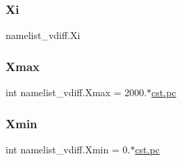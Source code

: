 \subsubsection{\texorpdfstring{Xi}{Xi}}
{\footnotesize\ttfamily namelist\+\_\+vdiff.\+Xi}

\mbox{\label{namespacenamelist__vdiff_a7cd8a3edb14ea27a804141f3e858ed3e}} 
\subsubsection{\texorpdfstring{Xmax}{Xmax}}
{\footnotesize\ttfamily int namelist\+\_\+vdiff.\+Xmax = 2000.$\ast$\hyperlink{constants_8h_a2884cd030c4c825754349a525a1d06ce}{cst.\+pc}}

\mbox{\label{namespacenamelist__vdiff_abca97361a0eed05f691f780900b95d01}} 
\subsubsection{\texorpdfstring{Xmin}{Xmin}}
{\footnotesize\ttfamily int namelist\+\_\+vdiff.\+Xmin = 0.$\ast$\hyperlink{constants_8h_a2884cd030c4c825754349a525a1d06ce}{cst.\+pc}}

